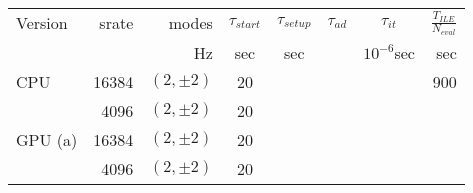 \documentclass[twocolumn,prd,nofootinbib]{revtex4}
\newcommand\editremark[1]{{\color{red} #1}}
\begin{document}
\begin{table}
\begin{tabular}{lrr|cccc|r}
Version & srate & modes & $\tau_{start}$ & $\tau_{setup}$ & $\tau_{ad}$ & $\tau_{it}$ & $\frac{T_{ILE}}{N_{eval}}$\\  %
  &  & Hz & sec & sec & & $10^{-6} $sec & sec\\ \hline 
CPU & 16384 & $(2,\pm 2) $ & 20 & & & &  \editremark{900}  \\ 
       & 4096 & $(2,\pm 2) $ &   20 \\ \hline
GPU (a) & 16384 & $(2,\pm 2) $  & 20  & &   \\
            & 4096 &$(2,\pm 2) $  &  20 &\\

\end{tabular}
\end{table}
\end{document}

